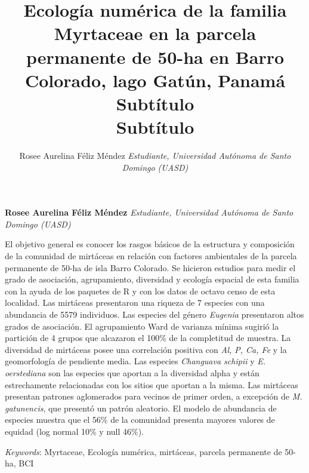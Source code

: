 \documentclass[11pt,]{article}
\title{Ecología numérica de la familia Myrtaceae en la parcela permanente de
50-ha en Barro Colorado, lago Gatún, Panamá\\
Subtítulo\\
Subtítulo  }
\author{\Large Rosee Aurelina Féliz Méndez\vspace{0.05in} \newline\normalsize\emph{Estudiante, Universidad Autónoma de Santo Domingo (UASD)}  }
\date{}
\newcommand*{\authorfont}{\fontfamily{phv}\selectfont}
\renewenvironment{abstract}
 {{%
    \setlength{\leftmargin}{0mm}
    \setlength{\rightmargin}{\leftmargin}%
  }%
  \relax}
 {\endlist}
\begin{document}
	
%

{%
\setlength{\parindent}{0pt}
\thispagestyle{plain}
{\fontsize{18}{20}\selectfont\raggedright 
\maketitle  %

}

{
   \vskip 13.5pt\relax \normalsize\fontsize{11}{12} 
\textbf{\authorfont Rosee Aurelina Féliz Méndez} \hskip 15pt \emph{\small Estudiante, Universidad Autónoma de Santo Domingo (UASD)}   

}

}








\begin{abstract}

    \hbox{\vrule height .2pt width 39.14pc}

    \vskip 8.5pt %

\noindent El objetivo general es conocer los rasgos básicos de la estructura y
composición de la comunidad de mirtáceas en relación con factores
ambientales de la parcela permanente de 50-ha de isla Barro Colorado. Se
hicieron estudios para medir el grado de asociación, agrupamiento,
diversidad y ecología espacial de esta familia con la ayuda de los
paquetes de R y con los datos de octavo censo de esta localidad. Las
mirtáceas presentaron una riqueza de 7 especies con una abundancia de
5579 individuos. Las especies del género \emph{Eugenia} presentaron
altos grados de asociación. El agrupamiento Ward de varianza mínima
sugirió la partición de 4 grupos que alcazaron el 100\% de la
completitud de muestra. La diversidad de mirtáceas posee una correlación
positiva con \emph{Al, P, Ca, Fe} y la geomorfología de pendiente media.
Las especies \emph{Changuava schipii} y \emph{E. oerstediana} son las
especies que aportan a la diversidad alpha y están estrechamente
relacionadas con los sitios que aportan a la misma. Las mirtáceas
presentan patrones aglomerados para vecinos de primer orden, a excepción
de \emph{M. gatunencis}, que presentó un patrón aleatorio. El modelo de
abundancia de especies muestra que el 56\% de la comunidad presenta
mayores valores de equidad (log normal 10\% y null 46\%).


\vskip 8.5pt \noindent \emph{Keywords}: Myrtaceae, Ecología numérica, mirtáceas, parcela permanente de 50-ha,
BCI \par

    \hbox{\vrule height .2pt width 39.14pc}



\end{abstract}
\end{document}
